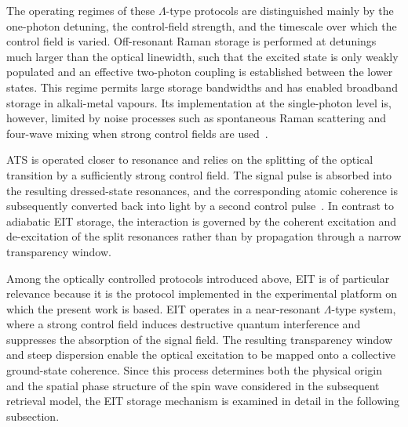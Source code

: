 The operating regimes of these $\Lambda$-type protocols are distinguished mainly by the one-photon detuning, the control-field strength, and the timescale over which the control field is varied. Off-resonant Raman storage is performed at detunings much larger than the optical linewidth, such that the excited state is only weakly populated and an effective two-photon coupling is established between the lower states. This regime permits large storage bandwidths and has enabled broadband storage in alkali-metal vapours. Its implementation at the single-photon level is, however, limited by noise processes such as spontaneous Raman scattering and four-wave mixing when strong control fields are used~\cite{Qmeaara_HeshamiEtAl_2016,Oqm_LvovskyEtAl_2009}.

ATS is operated closer to resonance and relies on the splitting of the optical transition by a sufficiently strong control field. The signal pulse is absorbed into the resulting dressed-state resonances, and the corresponding atomic coherence is subsequently converted back into light by a second control pulse~\cite{AWAVQMitCoSR_Rodriguez_}. In contrast to adiabatic EIT storage, the interaction is governed by the coherent excitation and de-excitation of the split resonances rather than by propagation through a narrow transparency window.

Among the optically controlled protocols introduced above, EIT is of particular relevance because it is the protocol implemented in the experimental platform on which the present work is based. EIT operates in a near-resonant $\Lambda$-type system, where a strong control field induces destructive quantum interference and suppresses the absorption of the signal field. The resulting transparency window and steep dispersion enable the optical excitation to be mapped onto a collective ground-state coherence. Since this process determines both the physical origin and the spatial phase structure of the spin wave considered in the subsequent retrieval model, the EIT storage mechanism is examined in detail in the following subsection.

